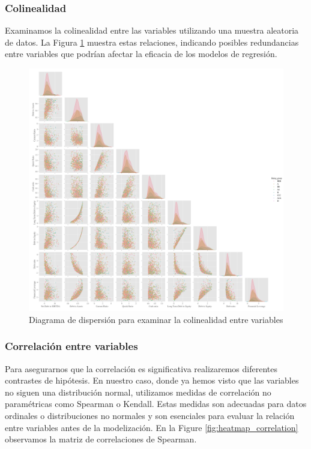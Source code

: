 \documentclass{article}
\begin{document}
\subsubsection{Colinealidad}
Examinamos la colinealidad entre las variables utilizando una muestra aleatoria de datos. La Figura \ref{fig:pairplot} muestra estas relaciones, indicando posibles redundancias entre variables que podrían afectar la eficacia de los modelos de regresión. 

\begin{figure}
\centering
\includegraphics[width=1\textwidth]{pairplot.png}
\caption{Diagrama de dispersión para examinar la colinealidad entre variables}
\label{fig:pairplot}
\end{figure}

\subsubsection{Correlación entre variables}
Para asegurarnos que la correlación es significativa realizaremos diferentes contrastes de hipótesis. En nuestro caso, donde ya hemos visto que  las variables no siguen una distribución normal, utilizamos medidas de correlación no paramétricas como Spearman o Kendall. Estas medidas son adecuadas para datos ordinales o distribuciones no normales y son esenciales para evaluar la relación entre variables antes de la modelización. En la Figure \ref{fig:heatmap_correlation} observamos la matriz de correlaciones de Spearman.
\end{document}
